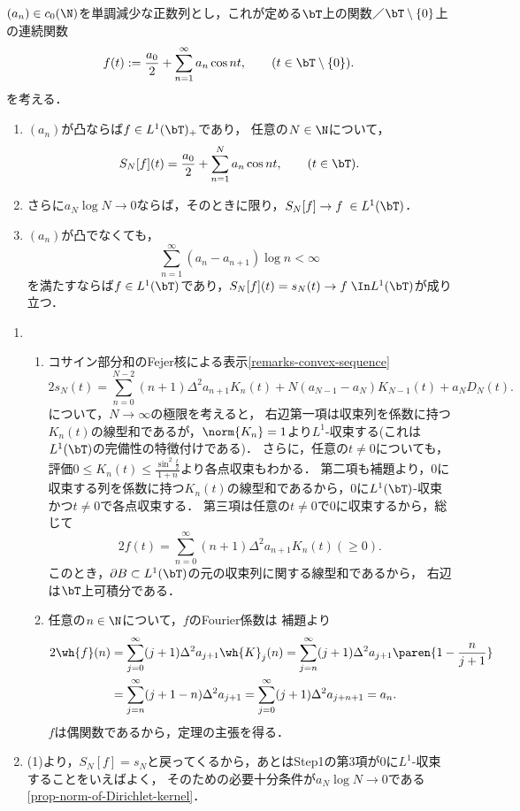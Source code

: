 \documentclass[uplatex,dvipdfmx]{jsreport}
\begin{document}
\begin{theorem}[コサイン級数が可積分関数を定めるための条件]\label{thm-convergent-cosine-series}
    $(a_n)\in c_0(\N)$を単調減少な正数列とし，これが定める$\bT$上の関数／$\bT\setminus\{0\}$上の連続関数
    \[f(t):=\frac{a_0}{2}+\sum_{n=1}^\infty a_n\cos nt,\qquad (t\in\bT\setminus\{0\}).\]
    を考える．
    \begin{enumerate}
        \item $(a_n)$が凸ならば$f\in L^1(\bT)_+$であり，
        任意の$N\in\N$について，
        \[S_N[f](t)=\frac{a_0}{2}+\sum_{n=1}^Na_n\cos nt,\qquad(t\in\bT).\]
        \item さらに$a_N\log N\to0$ならば，そのときに限り，$S_N[f]\to f\;\in L^1(\bT)$．
        \item $(a_n)$が凸でなくても，
        \[\sum_{n=1}^\infty(a_n-a_{n+1})\log n<\infty\]
        を満たすならば$f\in L^1(\bT)$であり，$S_N[f](t)=s_N(t)\to f\;\In L^1(\bT)$が成り立つ．
    \end{enumerate}
\end{theorem}
\begin{Proof}\mbox{}
    \begin{enumerate}
        \item 
        \begin{enumerate}[{Step}1]
            \item コサイン部分和のFejer核による表示\ref{remarks-convex-sequence}
            \[2s_N(t)=\sum_{n=0}^{N-2}(n+1)\Delta^2a_{n+1}K_n(t)+N(a_{N-1}-a_N)K_{N-1}(t)+a_ND_N(t).\]
            について，$N\to\infty$の極限を考えると，
            右辺第一項は収束列を係数に持つ$K_n(t)$の線型和であるが，$\norm{K_n}=1$より$L^1$-収束する(これは$L^1(\bT)$の完備性の特徴付けである)．
            さらに，任意の$t\ne0$についても，評価$0\le K_n(t)\le\frac{\sin^2\frac{t}{2}}{1+n}$より各点収束もわかる．
            第二項も補題より，$0$に収束する列を係数に持つ$K_n(t)$の線型和であるから，$0$に$L^1(\bT)$-収束かつ$t\ne0$で各点収束する．
            第三項は任意の$t\ne0$で$0$に収束するから，総じて
            \[2f(t)=\sum_{n=0}^\infty(n+1)\Delta^2a_{n+1}K_n(t)(\ge0).\]
            このとき，$\partial B\subset L^1(\bT)$の元の収束列に関する線型和であるから，
            右辺は$\bT$上可積分である．
            \item 任意の$n\in\N$について，$f$のFourier係数は
            補題より
            \begin{align*}
                2\wh{f}(n)&=\sum_{j=0}^\infty(j+1)\Delta^2a_{j+1}\wh{K}_j(n)=\sum_{j=n}^\infty(j+1)\Delta^2a_{j+1}\paren{1-\frac{n}{j+1}}\\
                &=\sum_{j=n}^\infty(j+1-n)\Delta^2a_{j+1}=\sum_{j=0}^\infty(j+1)\Delta^2a_{j+n+1}=a_n.
            \end{align*}
            $f$は偶関数であるから，定理の主張を得る．
        \end{enumerate}
        \item (1)より，$S_N[f]=s_N$と戻ってくるから，あとはStep1の第3項が$0$に$L^1$-収束することをいえばよく，
        そのための必要十分条件が$a_N\log N\to0$である\ref{prop-norm-of-Dirichlet-kernel}．
    \end{enumerate}
\end{Proof}
\end{document}
